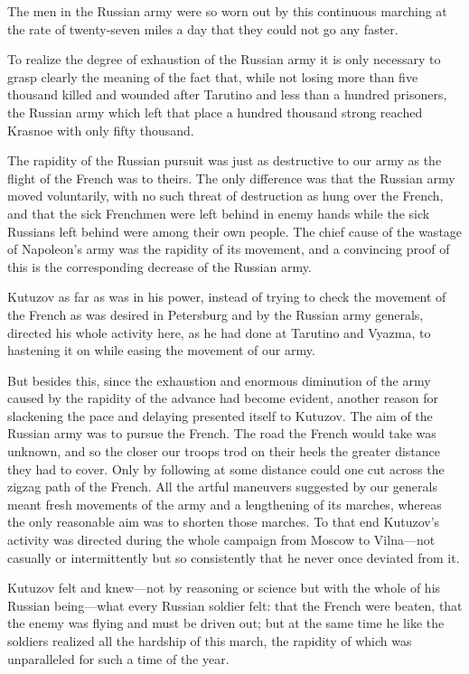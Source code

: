 The men in the Russian army were so worn out by this continuous
marching at the rate of twenty-seven miles a day that they could
not go any faster.

To realize the degree of exhaustion of the Russian army it is
only necessary to grasp clearly the meaning of the fact that,
while not losing more than five thousand killed and wounded after
Tarutino and less than a hundred prisoners, the Russian army
which left that place a hundred thousand strong reached Krasnoe
with only fifty thousand.

The rapidity of the Russian pursuit was just as destructive to
our army as the flight of the French was to theirs. The only
difference was that the Russian army moved voluntarily, with no
such threat of destruction as hung over the French, and that the
sick Frenchmen were left behind in enemy hands while the sick
Russians left behind were among their own people. The chief cause
of the wastage of Napoleon's army was the rapidity of its
movement, and a convincing proof of this is the corresponding
decrease of the Russian army.

Kutuzov as far as was in his power, instead of trying to check
the movement of the French as was desired in Petersburg and by
the Russian army generals, directed his whole activity here, as
he had done at Tarutino and Vyazma, to hastening it on while
easing the movement of our army.

But besides this, since the exhaustion and enormous diminution of
the army caused by the rapidity of the advance had become
evident, another reason for slackening the pace and delaying
presented itself to Kutuzov.  The aim of the Russian army was to
pursue the French. The road the French would take was unknown,
and so the closer our troops trod on their heels the greater
distance they had to cover. Only by following at some distance
could one cut across the zigzag path of the French. All the
artful maneuvers suggested by our generals meant fresh movements
of the army and a lengthening of its marches, whereas the only
reasonable aim was to shorten those marches. To that end
Kutuzov's activity was directed during the whole campaign from
Moscow to Vilna---not casually or intermittently but so
consistently that he never once deviated from it.

Kutuzov felt and knew---not by reasoning or science but with the
whole of his Russian being---what every Russian soldier felt:
that the French were beaten, that the enemy was flying and must
be driven out; but at the same time he like the soldiers realized
all the hardship of this march, the rapidity of which was
unparalleled for such a time of the year.

